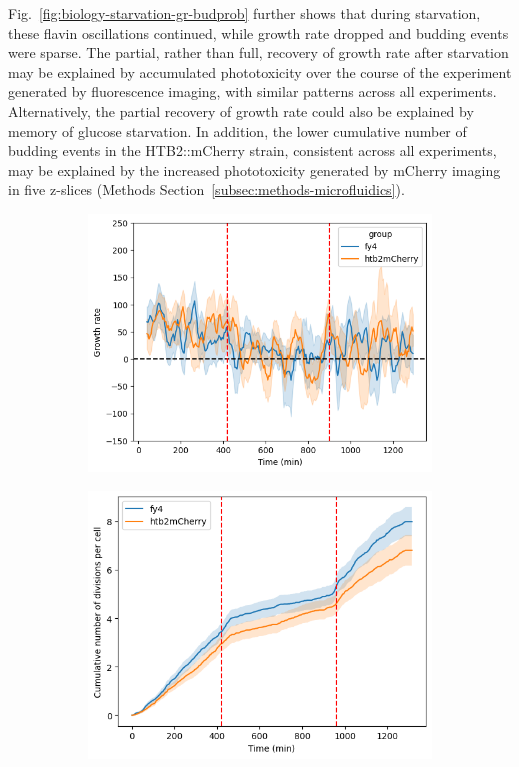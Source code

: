 Fig.\ \ref{fig:biology-starvation-gr-budprob} further shows that during starvation, these flavin oscillations continued, while growth rate dropped and budding events were sparse.
The partial, rather than full, recovery of growth rate after starvation may be explained by accumulated phototoxicity over the course of the experiment generated by fluorescence imaging, with similar patterns across all experiments.
Alternatively, the partial recovery of growth rate could also be explained by memory of glucose starvation.
In addition, the lower cumulative number of budding events in the HTB2::mCherry strain, consistent across all experiments, may be explained by the increased phototoxicity generated by mCherry imaging in five z-slices (Methods Section~\ref{subsec:methods-microfluidics}).

\begin{figure}
  \centering
  \begin{subfigure}[htpb]{0.45\textwidth}
   \centering
   \includegraphics[width=\textwidth]{allstrains_19972_gr}
   \caption{
   }
   \label{fig:biology-starvation-gr}
  \end{subfigure}%
  \begin{subfigure}[htpb]{0.45\textwidth}
   \centering
   \includegraphics[width=\textwidth]{allstrains_19972_cumul}
   \caption{
   }
   \label{fig:biology-starvation-cumul}
  \end{subfigure}


\end{figure}
